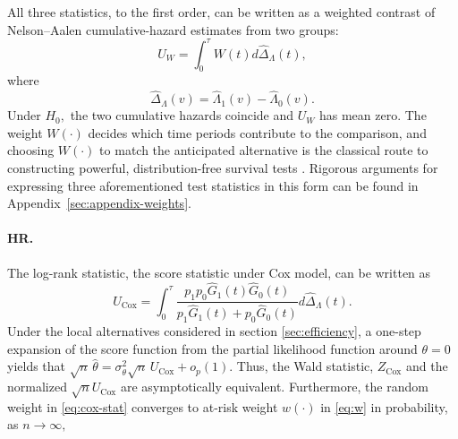 \documentclass[12pt]{article}
\begin{document}
All three statistics, to the first order, can be written as a weighted contrast of
Nelson--Aalen cumulative-hazard estimates from two groups:
\begin{equation}\label{eq:wlr-generic}
  U_W=\int_0^\tau W(t)d\hat{\Delta}_\Lambda(t),
\end{equation}
 where
\[
  \hat{\Delta}_\Lambda(v)=\hat\Lambda_1(v)-\hat\Lambda_0(v).
\]
Under $H_0,$ the two cumulative hazards coincide and $U_W$ has mean zero. The
weight $W(\cdot)$ decides which time periods contribute to the comparison, and
choosing $W(\cdot)$ to match the anticipated alternative is the classical route to
constructing powerful, distribution-free survival tests \citep{FlemingHarrington1991,Tian2018}. Rigorous arguments for expressing three aforementioned test statistics in this form can be found in Appendix~\ref{sec:appendix-weights}.

\paragraph{HR.}
The log-rank statistic, the score statistic under Cox model, can be written as
\begin{equation}\label{eq:cox-stat}
  U_{\mathrm{Cox}}
    =\int_0^\tau \frac{p_1p_0\hat{G}_1(t)\hat{G}_0(t)}{p_1\hat{G}_1(t)+p_0\hat{G}_0(t)}
     d\hat{\Delta}_\Lambda(t).
\end{equation}
 Under
the local alternatives considered in section \ref{sec:efficiency}, a one-step expansion of the score function from the partial likelihood function around $\theta=0$ yields that
$\sqrt n\,\hat\theta=\sigma_\theta^2\sqrt n\,U_{\mathrm{Cox}}+o_p(1)$. Thus, the Wald statistic,  $Z_{\mathrm{Cox}}$ and the normalized $\sqrt{n}U_{\mathrm{Cox}}$ are asymptotically equivalent. Furthermore,
the random weight in \eqref{eq:cox-stat} converges to at-risk weight $w(\cdot)$ in
\eqref{eq:w} in probability, as $n \to \infty,$
\end{document}
